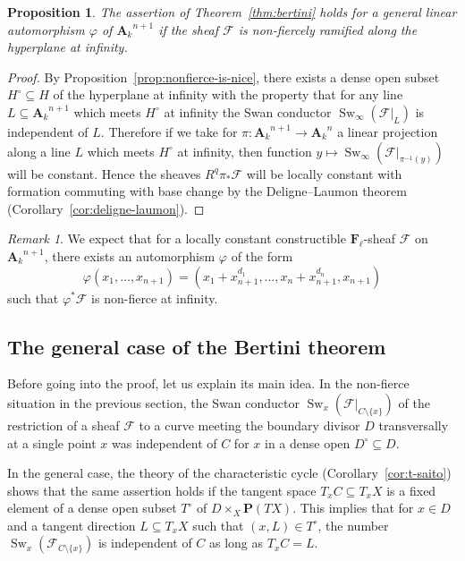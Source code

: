 \documentclass[twoside]{amsart}
\renewcommand{\AA}{\mathbf{A}}
\newcommand{\FF}{\mathbf{F}}
\newcommand{\PP}{\mathbf{P}}
\newcommand{\Ff}{\mathscr{F}}
\DeclareMathOperator{\Swan}{Sw}
\newcommand{\ANK}[2]{{\AA_{#2}}^{\! \! \! \!  #1}} %
\newcommand{\AN}[1]{\ANK{#1}{k}}
\renewcommand{\phi}{\varphi}
\renewcommand{\to}{\longrightarrow}
\theoremstyle{plain}
\newtheorem{proposition}[subsubsection]{Proposition}
\theoremstyle{definition}
\theoremstyle{remark}
\newtheorem{remark}[subsubsection]{Remark}
\numberwithin{equation}{subsection}
\begin{document}
\begin{proposition} \label{prop:bertini-nonfierce}
	The assertion of Theorem~\ref{thm:bertini} holds for a general linear automorphism $\phi$ of $\AN{n+1}$ if the sheaf $\Ff$ is non-fiercely ramified along the hyperplane at infinity. 
\end{proposition}

\begin{proof}
By Proposition~\ref{prop:nonfierce-is-nice}, there exists a dense open subset $H^\circ\subseteq H$ of the hyperplane at infinity with the property that for any line $L\subseteq \AN{n+1}$ which meets $H^\circ$ at infinity the Swan conductor $\Swan_\infty(\Ff|_L)$ is independent of $L$. Therefore if we take for $\pi\colon \AN{n+1}\to \AN{n}$ a linear projection along a line $L$ which meets $H^\circ$ at infinity, then function $y\mapsto \Swan_\infty(\Ff|_{\pi^{-1}(y)})$ will be constant. Hence the sheaves $R^q \pi_* \Ff$ will be locally constant with formation commuting with base change by the Deligne--Laumon theorem (Corollary~\ref{cor:deligne-laumon}).
\end{proof}

\begin{remark}
We expect that for a locally constant constructible $\FF_\ell$-sheaf $\Ff$ on $\AN{n+1}$, there exists an automorphism $\phi$ of the form
\[ 
	\phi(x_1, \ldots, x_{n+1}) 
	= (x_1 + x_{n+1}^{d_1}, \ldots, x_{n} + x_{n+1}^{d_n}, x_{n+1})
\]
such that $\phi^* \Ff$ is non-fierce at infinity. 
\end{remark}

\subsection{The general case of the Bertini theorem} 
\label{ss:bertini}

Before going into the proof, let us explain its main idea. In the non-fierce situation in the previous section, the Swan conductor $\Swan_x(\Ff|_{C\setminus \{x\}})$ of the restriction of a sheaf $\Ff$ to a curve meeting the boundary divisor $D$ transversally at a single point $x$ was independent of $C$ for $x$ in a dense open $D^\circ\subseteq D$. 

In the general case, the theory of the characteristic cycle (Corollary~\ref{cor:t-saito}) shows that the same assertion holds if the tangent space $T_x C \subseteq T_x X$ is a fixed element of a dense open subset $T^\circ$ of $D\times_X \PP(T X)$. This implies that for $x\in D$ and a tangent direction $L\subseteq T_x X$ such that $(x, L)\in T^\circ$, the number $\Swan_x(\Ff_{C\setminus \{x\}})$ is independent of $C$ as long as $T_x C = L$. 
\end{document}
